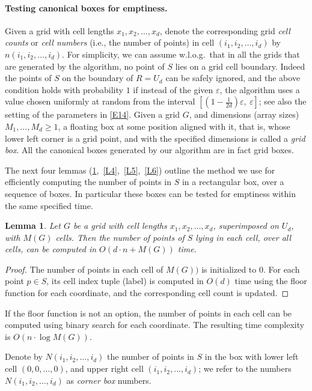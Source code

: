 \documentclass[11pt]{article}
\newtheorem{lemma}{Lemma}
\newcommand{\eps}{\varepsilon}
\begin{document}
\paragraph{Testing canonical boxes for emptiness.}

Given a grid with cell lengths $x_1,x_2,\ldots,x_d$, denote the corresponding 
grid {\em cell counts} or {\em cell numbers}
(i.e., the number of points) in cell
$(i_1,i_2,\ldots,i_d)$ by $n(i_1,i_2,\ldots,i_d)$.
For simplicity, we can assume w.l.o.g.\ that in all the grids that are
generated by the algorithm, no point of $S$ lies on a grid cell
boundary. Indeed the points of $S$ on the boundary of $R=U_d$ can be
safely ignored, and the above condition holds with probability $1$
if instead of the given $\eps$, the algorithm uses a value chosen
uniformly at random from the interval $[(1-\frac{1}{2d})\eps, \ \eps]$;
see also the setting of the parameters in \eqref{E14}. 
Given a grid $G$, and dimensions (array sizes) $M_1,\ldots,M_d \geq 1$, 
a floating box at some position aligned with it, that is,
whose lower left corner is a grid point, and with the specified 
dimensions is called a {\em grid box}. All the canonical boxes
generated by our algorithm are in fact grid boxes. 

The next four lemmas (\ref{L3},~\ref{L4},~\ref{L5},~\ref{L6})
outline the method we use for efficiently computing the 
number of points in $S$ in a rectangular box, over a sequence 
of boxes. In particular these boxes can be tested for emptiness within
the same specified time. 

\begin{lemma} \label{L3}
Let $G$ be a grid with cell lengths $x_1,x_2,\ldots,x_d$, 
superimposed on $U_d$, with $M(G)$ cells.
Then the number of points of $S$ lying in each cell, over all cells,
can be computed in $O(d \cdot n + M(G))$ time. 
\end{lemma}
\begin{proof}
The number of points in each cell of $M(G))$ is initialized to $0$. 
For each point $p \in S$, its cell index tuple (label) is computed
in $O(d)$ time using the floor function for each coordinate, 
and the corresponding cell count is updated. 
\end{proof}

 If the floor function is not an option,
the number of points in each cell can be computed using binary search 
for each coordinate. The resulting time complexity is
$O(n \cdot \log{M(G)})$. 

\medskip
Denote by $N(i_1,i_2,\ldots,i_d)$ the number of points in $S$ in the
box with lower left cell $(0,0,\ldots,0)$, and upper right cell
$(i_1,i_2,\ldots,i_d)$; we refer to the numbers $N(i_1,i_2,\ldots,i_d)$ 
as {\em corner box} numbers. 
\end{document}
